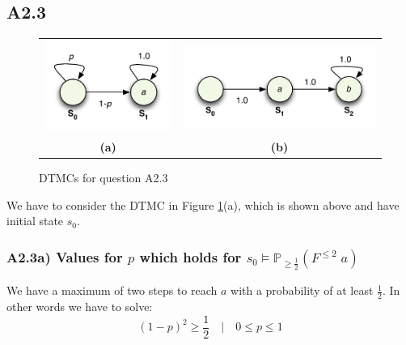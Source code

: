 \documentclass[12pt]{report}
\begin{document}
\subsection*{A2.3}
\begin{figure}[H]
	\begin{center}
	\begin{tabular}{c c}
		\includegraphics[scale=.85]{../GFX/ExerciseFigure2a.pdf} &
		\includegraphics[scale=.85]{../GFX/ExerciseFigure2b.pdf}\\
		\textbf{\Large(a)} & \textbf{\Large(b)}
	\end{tabular}
	\end{center}
	\caption{DTMCs for question A2.3}
	\label{fig:2a3}
\end{figure}

We have to consider the DTMC in Figure \ref{fig:2a3}(a), which is shown above and have initial state $s_0$.

\subsubsection*{A2.3a) Values for $p$ which holds for $s_0 \models \mathbb{P}_{\geq \frac{1}{2}}(F^{\leq 2}\; a)$}
We have a maximum of two steps to reach $a$ with a probability of at least $\frac{1}{2}$. In other words we have to solve:
$$(1-p)^2 \geq \frac{1}{2} \quad | \quad 0 \leq p \leq 1$$
\end{document}
